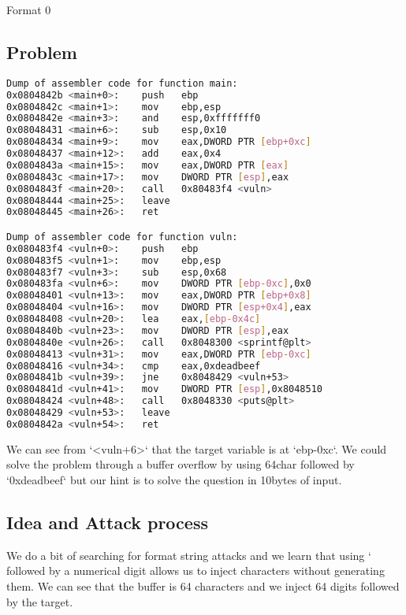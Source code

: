 
\begin{center}\begin{LARGE}Format 0\end{LARGE}\end{center}
 
\subsection*{Problem}

\begin{lstlisting}[language=bash]
Dump of assembler code for function main:
0x0804842b <main+0>:    push   ebp
0x0804842c <main+1>:    mov    ebp,esp
0x0804842e <main+3>:    and    esp,0xfffffff0
0x08048431 <main+6>:    sub    esp,0x10
0x08048434 <main+9>:    mov    eax,DWORD PTR [ebp+0xc]
0x08048437 <main+12>:   add    eax,0x4
0x0804843a <main+15>:   mov    eax,DWORD PTR [eax]
0x0804843c <main+17>:   mov    DWORD PTR [esp],eax
0x0804843f <main+20>:   call   0x80483f4 <vuln>
0x08048444 <main+25>:   leave
0x08048445 <main+26>:   ret

Dump of assembler code for function vuln:
0x080483f4 <vuln+0>:    push   ebp
0x080483f5 <vuln+1>:    mov    ebp,esp
0x080483f7 <vuln+3>:    sub    esp,0x68
0x080483fa <vuln+6>:    mov    DWORD PTR [ebp-0xc],0x0
0x08048401 <vuln+13>:   mov    eax,DWORD PTR [ebp+0x8]
0x08048404 <vuln+16>:   mov    DWORD PTR [esp+0x4],eax
0x08048408 <vuln+20>:   lea    eax,[ebp-0x4c]
0x0804840b <vuln+23>:   mov    DWORD PTR [esp],eax
0x0804840e <vuln+26>:   call   0x8048300 <sprintf@plt>
0x08048413 <vuln+31>:   mov    eax,DWORD PTR [ebp-0xc]
0x08048416 <vuln+34>:   cmp    eax,0xdeadbeef
0x0804841b <vuln+39>:   jne    0x8048429 <vuln+53>
0x0804841d <vuln+41>:   mov    DWORD PTR [esp],0x8048510
0x08048424 <vuln+48>:   call   0x8048330 <puts@plt>
0x08048429 <vuln+53>:   leave
0x0804842a <vuln+54>:   ret
\end{lstlisting}

We can see from `<vuln+6>` that the target variable is at `ebp-0xc`. We could solve
the problem through a buffer overflow by using 64char followed by `0xdeadbeef`
but our hint is to solve the question in 10bytes of input.

\subsection*{Idea and Attack process}

We do a bit of searching for format string attacks and we learn that using `%
followed by a numerical digit allows us to inject characters without generating
them. We can see that the buffer is 64 characters and we inject 64 digits followed
by the target.

